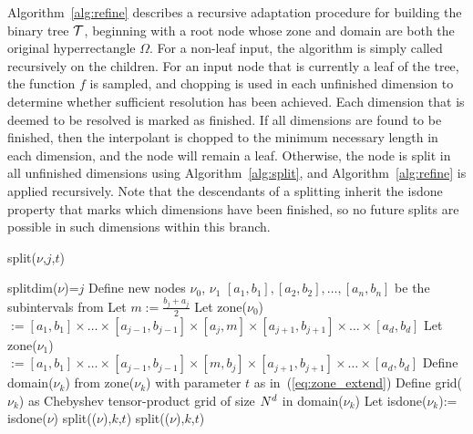 Algorithm~\ref{alg:refine}  describes a recursive adaptation procedure for building the binary tree $\mathcal{T}$, beginning with a root node whose zone and domain are both the original hyperrectangle $\Omega$. For a non-leaf input, the algorithm is simply called recursively on the children. For an input node that is currently a leaf of the tree, the function $f$ is sampled, and chopping is used in each unfinished dimension to determine whether sufficient resolution has been achieved. Each dimension that is deemed to be resolved is marked as finished. If all dimensions are found to be finished, then the interpolant is chopped to the minimum necessary length in each dimension, and the node will remain a leaf. Otherwise, the node is split in all unfinished dimensions using Algorithm~\ref{alg:split}, and Algorithm~\ref{alg:refine} is applied recursively. Note that the descendants of a splitting inherit the \textsf{isdone} property that marks which dimensions have been finished, so no future splits are possible in such dimensions within this branch. 

\begin{algorithm}
\caption{split($\nu$,$j$,$t$)}
\label{alg:split}
\begin{algorithmic}
\STATE \textsf{splitdim}($\nu$)=$j$
\STATE Define new nodes $\nu_0$, $\nu_1$
\STATE $[a_1,b_1],[a_2,b_2],\dots,[a_n,b_n]$ be the subintervals from 
\STATE Let $m:= \frac{b_j+a_j}{2}$
\STATE Let \textsf{zone}($\nu_0$) $:= [a_1,b_1] \times \dots \times [a_{j-1},b_{j-1}] \times [a_{j},m] \times [a_{j+1},b_{j+1}] \times \dots \times [a_{d},b_{d}] $
\STATE Let \textsf{zone}($\nu_1$) $:= [a_1,b_1] \times \dots \times [a_{j-1},b_{j-1}] \times [m,b_{j}] \times [a_{j+1},b_{j+1}] \times \dots \times [a_{d},b_{d}] $
\STATE Define \textsf{domain}($\nu_k$) from \textsf{zone}($\nu_k$) with parameter $t$ as in~(\ref{eq:zone_extend})
\STATE Define \textsf{grid}($\nu_k$) as Chebyshev tensor-product grid of size $N^d$ in \textsf{domain}($\nu_k$)
\STATE Let \textsf{isdone}($\nu_k$):= \textsf{isdone}($\nu$)
\ENDFOR
\ELSE
\STATE split(($\nu$),$k$,$t$)
\STATE split(($\nu$),$k$,$t$)
\ENDIF
\end{algorithmic}
\end{algorithm}


